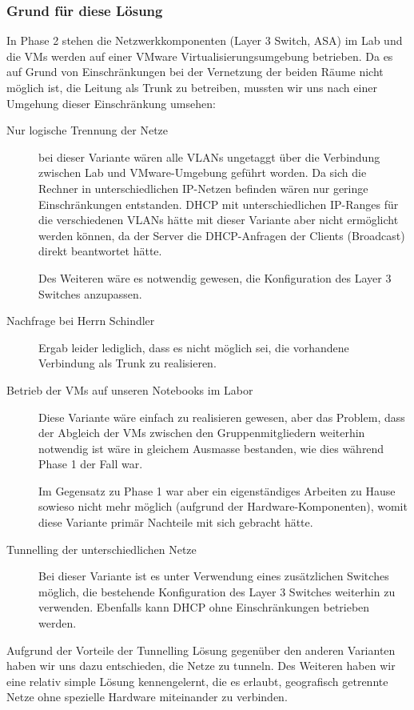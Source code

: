 \subsubsection{Grund für diese Lösung}
In Phase 2 stehen die Netzwerkkomponenten (Layer 3 Switch, ASA) im Lab und die VMs werden auf einer VMware Virtualisierungsumgebung betrieben. Da es auf Grund von Einschränkungen bei der Vernetzung der beiden Räume nicht möglich ist, die Leitung als Trunk zu betreiben, mussten wir uns nach einer Umgehung dieser Einschränkung umsehen:

\begin{description}
	\item[Nur logische Trennung der Netze] bei dieser Variante wären alle VLANs ungetaggt über die Verbindung zwischen Lab und VMware-Umgebung geführt worden. Da sich die Rechner in unterschiedlichen IP-Netzen befinden wären nur geringe Einschränkungen entstanden. DHCP mit unterschiedlichen IP-Ranges für die verschiedenen VLANs hätte mit dieser Variante aber nicht ermöglicht werden können, da der Server die DHCP-Anfragen der Clients (Broadcast) direkt beantwortet hätte.
	
	Des Weiteren wäre es notwendig gewesen, die Konfiguration des Layer 3 Switches anzupassen.
	\item[Nachfrage bei Herrn Schindler] Ergab leider lediglich, dass es nicht möglich sei, die vorhandene Verbindung als Trunk zu realisieren.
	\item[Betrieb der VMs auf unseren Notebooks im Labor] Diese Variante wäre einfach zu realisieren gewesen, aber das Problem, dass der Abgleich der VMs zwischen den Gruppenmitgliedern weiterhin notwendig ist wäre in gleichem Ausmasse bestanden, wie dies während Phase 1 der Fall war.
	
	Im Gegensatz zu Phase 1 war aber ein eigenständiges Arbeiten zu Hause sowieso nicht mehr möglich (aufgrund der Hardware-Komponenten), womit diese Variante primär Nachteile mit sich gebracht hätte.
	\item[Tunnelling der unterschiedlichen Netze] Bei dieser Variante ist es unter Verwendung eines zusätzlichen Switches möglich, die bestehende Konfiguration des Layer 3 Switches weiterhin zu verwenden. Ebenfalls kann DHCP ohne Einschränkungen betrieben werden.
\end{description}

Aufgrund der Vorteile der Tunnelling Lösung gegenüber den anderen Varianten haben wir uns dazu entschieden, die Netze zu tunneln. Des Weiteren haben wir eine relativ simple Lösung kennengelernt, die es erlaubt, geografisch getrennte Netze ohne spezielle Hardware miteinander zu verbinden.

